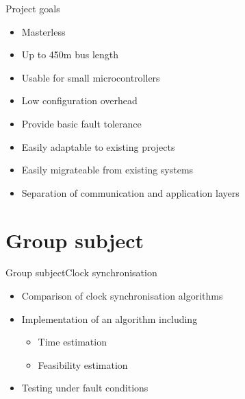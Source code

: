 \documentclass{beamer}
\begin{document}
\begin{frame}{Project goals}
\begin{center}
\begin{itemize}
 \item \begin{large}Masterless\end{large}
 \item \begin{large}Up to 450m bus length\end{large}
 \item \begin{large}Usable for small microcontrollers\end{large}
 \item \begin{large}Low configuration overhead\end{large}
 \item \begin{large}Provide basic fault tolerance\end{large}
 \item \begin{large}Easily adaptable to existing projects\end{large}
 \item \begin{large}Easily migrateable from existing systems\end{large}
 \item \begin{large}Separation of communication and application layers\end{large}
\end{itemize}
\end{center}

\end{frame}

\section{Group subject}
\begin{frame}{Group subject}{Clock synchronisation}
  \begin{itemize}
    \item \begin{large}Comparison of clock synchronisation algorithms\end{large}
    \item \begin{large}Implementation of an algorithm including\end{large}
      \begin{itemize}
	\item Time estimation
	\item Feasibility estimation
      \end{itemize}
    \item \begin{large}Testing under fault conditions\end{large}
  \end{itemize}
\end{frame}
\end{document}
